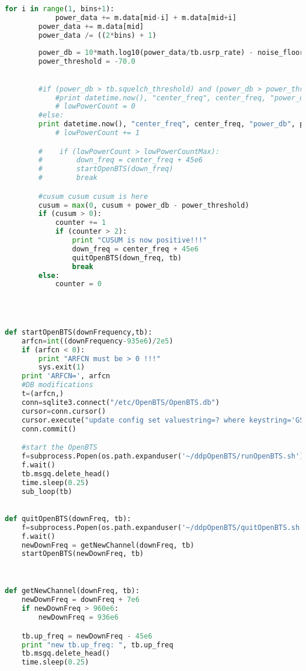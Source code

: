 \begin{lstlisting}[language=Python]
        for i in range(1, bins+1):
            power_data += m.data[mid-i] + m.data[mid+i]
        power_data += m.data[mid]
        power_data /= ((2*bins) + 1)
        
        power_db = 10*math.log10(power_data/tb.usrp_rate) - noise_floor_db
        power_threshold = -70.0
        

        #if (power_db > tb.squelch_threshold) and (power_db > power_threshold):
            #print datetime.now(), "center_freq", center_freq, "power_db", power_db, "in use"
            # lowPowerCount = 0
        #else:
        print datetime.now(), "center_freq", center_freq, "power_db", power_db
            # lowPowerCount += 1

        #    if (lowPowerCount > lowPowerCountMax):
        #        down_freq = center_freq + 45e6
        #        startOpenBTS(down_freq)
        #        break

        #cusum cusum cusum is here
        cusum = max(0, cusum + power_db - power_threshold)
        if (cusum > 0):
            counter += 1
            if (counter > 2):
                print "CUSUM is now positive!!!"
                down_freq = center_freq + 45e6
                quitOpenBTS(down_freq, tb)
                break
        else:
            counter = 0




def startOpenBTS(downFrequency,tb):
    arfcn=int((downFrequency-935e6)/2e5)
    if (arfcn < 0):
        print "ARFCN must be > 0 !!!"
        sys.exit(1)
    print 'ARFCN=', arfcn
    #DB modifications
    t=(arfcn,)
    conn=sqlite3.connect("/etc/OpenBTS/OpenBTS.db")
    cursor=conn.cursor()
    cursor.execute("update config set valuestring=? where keystring='GSM.Radio.C0'",t)
    conn.commit()

    #start the OpenBTS
    f=subprocess.Popen(os.path.expanduser('~/ddpOpenBTS/runOpenBTS.sh'))
    f.wait()
    tb.msgq.delete_head()
    time.sleep(0.25)
    sub_loop(tb)
              

def quitOpenBTS(downFreq, tb):
    f=subprocess.Popen(os.path.expanduser('~/ddpOpenBTS/quitOpenBTS.sh'))
    f.wait()    
    newDownFreq = getNewChannel(downFreq, tb)
    startOpenBTS(newDownFreq, tb)

        

def getNewChannel(downFreq, tb):
    newDownFreq = downFreq + 7e6
    if newDownFreq > 960e6:
        newDownFreq = 936e6

    tb.up_freq = newDownFreq - 45e6
    print "new tb.up_freq: ", tb.up_freq
    tb.msgq.delete_head()
    time.sleep(0.25)


\end{lstlisting}
